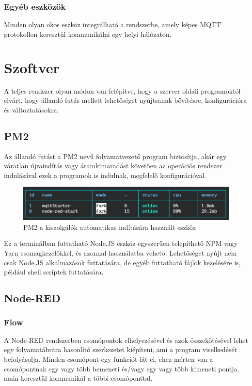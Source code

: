 \documentclass[
]{thesis-ekf}
\theoremstyle{definition}
\theoremstyle{remark}
\begin{document}
\subsection{Egyéb eszközök}
Minden olyan okos eszköz integrálható a rendszerbe, amely képes MQTT protokollon keresztül kommunikálni egy helyi hálózaton.



\chapter{Szoftver}
A teljes rendszer olyan módon van felépítve, hogy a szerver oldali programoktól elvárt, hogy állandó futás mellett lehetőséget 
nyújtsanak bővítésre, konfigurációra és változtatásokra. 
\section{PM2}
Az állandó futást a PM2\cite{pm2} nevű folyamatvezető program biztosítja, akár egy váratlan újraindítás vagy áramkimaradást követően az operációs rendszer indulásával ezek a programok is indulnak, megfelelő konfigurációval.

\begin{figure}[h]
	\includegraphics[width=1\textwidth]{images/pm2.png}
	\caption{PM2\cite{pm2} a kiszolgálók automatikus indítására használt eszköz}
\end{figure}

Ez a terminálban futtatható Node.JS eszköz egyszerűen telepíthető NPM vagy Yarn csomagkezelőkkel, és azonnal használatba vehető.
Lehetőséget nyújt nem csak Node.JS alkalmazások futtatására, de egyéb futtatható fájlok kezelésére is, például shell scriptek futtatására.

\section{Node-RED}
\subsection{Flow}
A Node-RED rendszerben csomópontok elhelyezésével és azok összekötésével lehet egy folyamatábrára hasonlító szerkezetet kiépíteni, 
ami a program viselkedését befolyásolja. Minden csomópont egy funkciót lát el, ehez mérten van a csomópontnak 
egy vagy több bemeneti és/vagy egy vagy több kimeneti pontja, amin keresztül kommunikál a többi csomóponttal.
\end{document}
